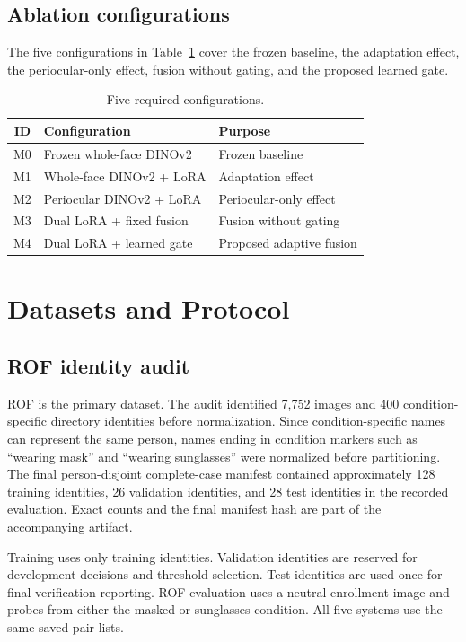 ﻿\documentclass[10pt,journal,compsoc]{IEEEtran}
\begin{document}
\subsection{Ablation configurations}
The five configurations in Table~\ref{tab:ablations} cover the frozen baseline, the adaptation effect, the periocular-only effect, fusion without gating, and the proposed learned gate.
\begin{table}[t]
\centering
\caption{Five required configurations.}
\label{tab:ablations}
\begin{tabular}{cll}
\toprule
ID & Configuration & Purpose\\
\midrule
M0 & Frozen whole-face DINOv2 & Frozen baseline\\
M1 & Whole-face DINOv2 + LoRA & Adaptation effect\\
M2 & Periocular DINOv2 + LoRA & Periocular-only effect\\
M3 & Dual LoRA + fixed fusion & Fusion without gating\\
M4 & Dual LoRA + learned gate & Proposed adaptive fusion\\
\bottomrule
\end{tabular}
\end{table}

\section{Datasets and Protocol}
\subsection{ROF identity audit}
ROF is the primary dataset. The audit identified 7,752 images and 400 condition-specific directory identities before normalization. Since condition-specific names can represent the same person, names ending in condition markers such as ``wearing mask'' and ``wearing sunglasses'' were normalized before partitioning. The final person-disjoint complete-case manifest contained approximately 128 training identities, 26 validation identities, and 28 test identities in the recorded evaluation. Exact counts and the final manifest hash are part of the accompanying artifact.

Training uses only training identities. Validation identities are reserved for development decisions and threshold selection. Test identities are used once for final verification reporting. ROF evaluation uses a neutral enrollment image and probes from either the masked or sunglasses condition. All five systems use the same saved pair lists.
\end{document}
